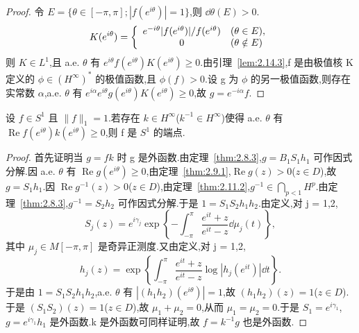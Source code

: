 \begin{proof}
令 $E = \{\theta \in [-\pi, \pi]; |f(e^{i\theta})| = 1\}$,则 $\dd \theta(E) > 0$.
\begin{equation*}
K(e^{i\theta}) = \left\{ \begin{array}{c l}
e^{-i\theta}|f(e^{i\theta})|/f(e^{i\theta}) & (\theta \in E), \\
0 & (\theta \notin E)
\end{array} \right.
\end{equation*}
则 $K \in L^{1}$,且 a.e. $\theta$ 有 $e^{i\theta}f(e^{i\theta})K(e^{i\theta}) \geq 0$.由引理~\ref{lem:2.14.3},f 是由极值核 K 定义的 $\phi \in (H^{\infty})^{*}$ 的极值函数,且 $\phi(f) > 0$.设 g 为 $\phi$ 的另一极值函数,则存在实常数 $\alpha$,a.e. $\theta$ 有 $e^{i\alpha}e^{i\theta}g(e^{i\theta})K(e^{i\theta}) \geq 0$,故 $g = e^{-i\alpha}f$.
\end{proof}

\begin{example}\label{exa:2.15.7}
设 $f \in S^{1}$ 且 $\|f\|_{1} = 1$.若存在 $k \in H^{\infty}$($k^{-1} \in H^{\infty}$)使得 a.e. $\theta$ 有 $\operatorname{Re} f(e^{i\theta})k(e^{i\theta}) \geq 0$,则 f 是 $S^{1}$ 的端点.
\end{example}

\begin{proof}
首先证明当 $g = fk$ 时 g 是外函数.由定理~\ref{thm:2.8.3},$g = B_{1}S_{1}h_{1}$ 可作因式分解.因 a.e. $\theta$ 有 $\operatorname{Re} g(e^{i\theta}) \geq 0$,由定理~\ref{thm:2.9.1},$\operatorname{Re} g(z) > 0$($z \in D$),故 $g = S_{1}h_{1}$.因 $\operatorname{Re} g^{-1}(z) > 0$($z \in D$),由定理~\ref{thm:2.11.2},$g^{-1} \in \bigcap_{p<1} H^{p}$.由定理~\ref{thm:2.8.3},$g^{-1} = S_{2}h_{2}$ 可作因式分解.于是 $1 = S_{1}S_{2}h_{1}h_{2}$.由定义,对 j = 1,2,
\begin{equation*}
S_{j}(z) = e^{i\gamma_{j}}\exp\left\{-\int_{-\pi}^{\pi} \frac{e^{it} + z}{e^{it} - z}\dd \mu_{j}(t)\right\},
\end{equation*}
其中 $\mu_{j} \in M[-\pi, \pi]$ 是奇异正测度.又由定义,对 j = 1,2,
\begin{equation*}
h_{j}(z) = \exp\left\{\int_{-\pi}^{\pi} \frac{e^{it} + z}{e^{it} - z}\log|h_{j}(e^{it})|\dd t\right\}.
\end{equation*}
于是由 $1 = S_{1}S_{2}h_{1}h_{2}$,a.e. $\theta$ 有 $|(h_{1}h_{2})(e^{i\theta})| = 1$,故 $(h_{1}h_{2})(z) = 1$($z \in D$).于是 $(S_{1}S_{2})(z) = 1$($z \in D$),故 $\mu_{1} + \mu_{2} = 0$,从而 $\mu_{1} = \mu_{2} = 0$.于是 $S_{1} = e^{i\gamma_{1}}$,$g = e^{i\gamma_{1}}h_{1}$ 是外函数.k 是外函数可同样证明,故 $f = k^{-1}g$ 也是外函数.
\end{proof}

